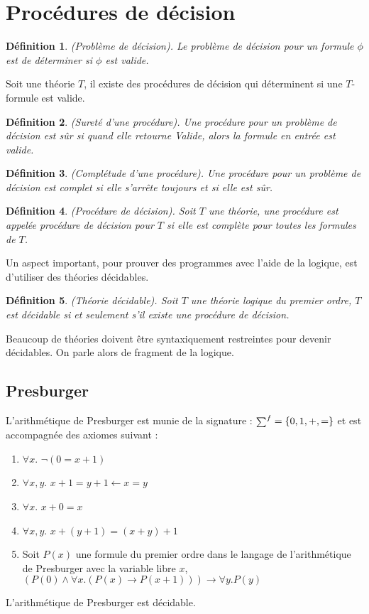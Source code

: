 \documentclass[9pt,openany]{book}
\newcommand\smallsum{\mathsmaller\sum}
\newtheorem{definition}{D\'efinition}[section]
\begin{document}
 	\section{Proc\'edures de d\'ecision}
 	\begin{definition}
 	(Probl\`eme de d\'ecision). Le probl\`eme de d\'ecision pour un formule $\phi$ est de d\'eterminer si $\phi$ est valide.
 	\end{definition}
 	Soit une th\'eorie $T$, il existe des proc\'edures de d\'ecision qui d\'eterminent si une $T$-formule est valide.
 	\begin{definition}
 	(Suret\'e d'une proc\'edure). Une proc\'edure pour un probl\`eme de d\'ecision est s\^ur si quand elle retourne \textit{Valide}, alors la formule en entr\'ee est valide.
 	\end{definition}
 	\begin{definition}
 		(Compl\'etude d'une proc\'edure). Une proc\'edure pour un probl\`eme de d\'ecision est complet si elle s'arr\^ete toujours et si elle est s\^ur.
 	\end{definition}
 	\begin{definition}
 	(Proc\'edure de d\'ecision). Soit $T$ une th\'eorie, une proc\'edure est appel\'ee \textit{proc\'edure de d\'ecision pour $T$} si elle est compl\`ete pour toutes les formules de $T$. 
 	\end{definition} 	
 	Un aspect important, pour prouver des programmes avec l'aide de la logique, est d'utiliser des th\'eories d\'ecidables.
	\begin{definition}
	(Th\'eorie d\'ecidable). Soit $T$ une th\'eorie logique du premier ordre, $T$ est d\'ecidable si et seulement s'il existe une proc\'edure de d\'ecision.
	\end{definition}
Beaucoup de th\'eories doivent \^etre syntaxiquement restreintes pour devenir d\'ecidables. On parle alors de fragment de la logique.		\				\subsection{Presburger}
		L'arithm\'etique de Presburger est munie de la signature : $\smallsum^{f}=\{0,1,+,=\}$ et est accompagn\'ee des axiomes suivant :
		\begin{enumerate}
		\item $\forall x.$ $\neg(0=x+1)$
		\item $\forall x,y.$ $x + 1=y+1\leftarrow x=y$
		\item $\forall x.$ $x+0=x$
		\item $\forall x,y.$ $x+(y+1)=(x+y)+1$
		\item Soit $P(x)$ une formule du premier ordre dans le langage de l'arithm\'etique de Presburger avec la variable libre $x$,\\
		$(P(0)\land\forall x.(P(x)\rightarrow P(x+1)))\rightarrow\forall y. P(y)$
		\end{enumerate}
		L'arithm\'etique de Presburger est d\'ecidable.
		
\end{document}
